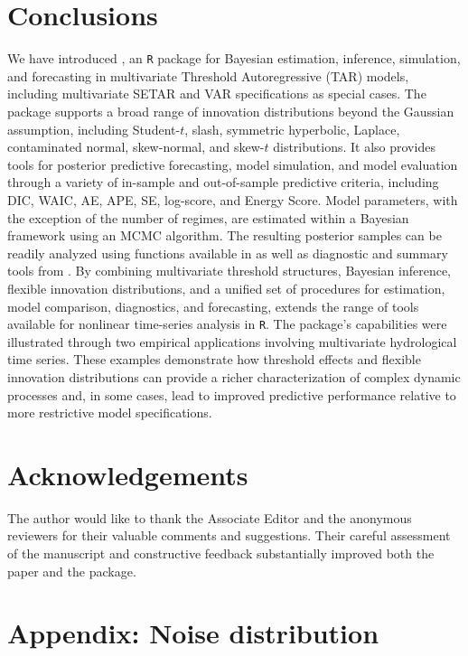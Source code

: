 \section*{Conclusions}
We have introduced , an \texttt{R} package for Bayesian estimation, inference, simulation, and forecasting in multivariate Threshold Autoregressive (TAR) models, including multivariate SETAR and VAR specifications as special cases. The package supports a broad range of innovation distributions beyond the Gaussian assumption, including Student-$t$, slash, symmetric hyperbolic, Laplace, contaminated normal, skew-normal, and skew-$t$ distributions. It also provides tools for posterior predictive forecasting, model simulation, and model evaluation through a variety of in-sample and out-of-sample predictive criteria, including DIC, WAIC, AE, APE, SE, log-score, and Energy Score. Model parameters, with the exception of the number of regimes, are estimated within a Bayesian framework using an MCMC algorithm. The resulting posterior samples can be readily analyzed using functions available in  as well as diagnostic and summary tools from . By combining multivariate threshold structures, Bayesian inference, flexible innovation distributions, and a unified set of procedures for estimation, model comparison, diagnostics, and forecasting,  extends the range of tools available for nonlinear time-series analysis in \texttt{R}. The package's capabilities were illustrated through two empirical applications involving multivariate hydrological time series. These examples demonstrate how threshold effects and flexible innovation distributions can provide a richer characterization of complex dynamic processes and, in some cases, lead to improved predictive performance relative to more restrictive model specifications.

\section*{Acknowledgements}
The author would like to thank the Associate Editor and the anonymous reviewers for their valuable comments and suggestions. Their careful assessment of the manuscript and constructive feedback substantially improved both the paper and the  package.

\appendix

\section{Appendix: Noise distribution}\label{Appen_Noise}

